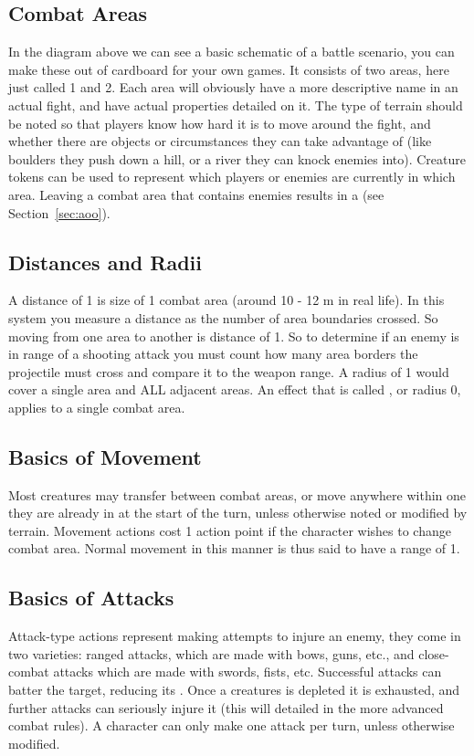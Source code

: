 \documentclass[a4paper,10pt,oneside]{book}
\newcommand{\textlf}[1]{\textbf{\titlecap{#1}}}
\newcommand{\textlfirst}[1]{\textbf{\textit{\titlecap{#1}}}}
\begin{document}
\subsection{Combat Areas}
In the diagram above we can see a basic schematic of a battle scenario, you can make these out of cardboard for your own games. It consists of two areas, here just called 1 and 2. Each area will obviously have a more descriptive name in an actual fight, and have actual properties detailed on it. The type of terrain should be noted so that players know how hard it is to move around the fight, and whether there are objects or circumstances they can take advantage of (like boulders they push down a hill, or a river they can knock enemies into). Creature tokens can be used to represent which players or enemies are currently in which area. Leaving a combat area that contains enemies results in a \textlf{Moment of weakness} (see Section~\ref{sec:aoo}).

\subsection{Distances and Radii}
A distance of 1 is size of 1 combat area (around 10 - 12 m in real life). In this system you measure a distance as the number of area boundaries crossed. So moving from one area to another is distance of 1. So to determine if an enemy is in range of a shooting attack you must count how many area borders the projectile must cross and compare it to the weapon range. A radius of 1 would cover a single area and ALL adjacent areas. An effect that is called \textlfirst{adjacent}, or radius 0, applies to a single combat area. 

\subsection{Basics of Movement}
Most creatures may transfer between combat areas, or move anywhere within one they are already in at the start of the turn, unless otherwise noted or modified by terrain. Movement actions cost 1 action point if the character wishes to change combat area. Normal movement in this manner is thus said to have a range of 1. 

\subsection{Basics of Attacks}
Attack-type actions represent making attempts to injure an enemy, they come in two varieties: ranged attacks, which are made with bows, guns, etc., and close-combat attacks which are made with swords, fists, etc. Successful attacks can batter the target, reducing its \textlf{endurance}. Once a creatures \textlf{endurance} is depleted it is exhausted, and further attacks can seriously injure it (this will detailed in the more advanced combat rules). A character can only make one attack per turn, unless otherwise modified. 
\end{document}
